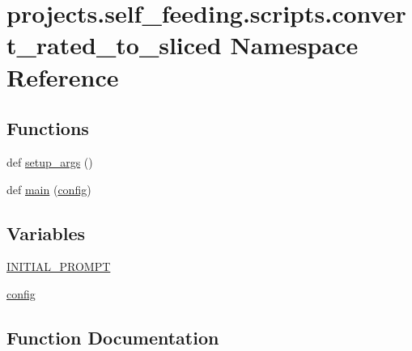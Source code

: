 \hypertarget{namespaceprojects_1_1self__feeding_1_1scripts_1_1convert__rated__to__sliced}{}\section{projects.\+self\+\_\+feeding.\+scripts.\+convert\+\_\+rated\+\_\+to\+\_\+sliced Namespace Reference}
\label{namespaceprojects_1_1self__feeding_1_1scripts_1_1convert__rated__to__sliced}
\subsection*{Functions}
\begin{DoxyCompactItemize}
\item 
def \hyperlink{namespaceprojects_1_1self__feeding_1_1scripts_1_1convert__rated__to__sliced_ae468e6330f1daa2e0ec2408e5049e097}{setup\+\_\+args} ()
\item 
def \hyperlink{namespaceprojects_1_1self__feeding_1_1scripts_1_1convert__rated__to__sliced_a818b0c6970270ed0a9a00c99e20faefd}{main} (\hyperlink{namespaceprojects_1_1self__feeding_1_1scripts_1_1convert__rated__to__sliced_ac1803c7956e2dc63a40562478498245c}{config})
\end{DoxyCompactItemize}
\subsection*{Variables}
\begin{DoxyCompactItemize}
\item 
\hyperlink{namespaceprojects_1_1self__feeding_1_1scripts_1_1convert__rated__to__sliced_a6b7cdfbcbf5853e5a70f43ce5c6de964}{I\+N\+I\+T\+I\+A\+L\+\_\+\+P\+R\+O\+M\+PT}
\item 
\hyperlink{namespaceprojects_1_1self__feeding_1_1scripts_1_1convert__rated__to__sliced_ac1803c7956e2dc63a40562478498245c}{config}
\end{DoxyCompactItemize}


\subsection{Function Documentation}
\mbox{\label{namespaceprojects_1_1self__feeding_1_1scripts_1_1convert__rated__to__sliced_a818b0c6970270ed0a9a00c99e20faefd}} 
